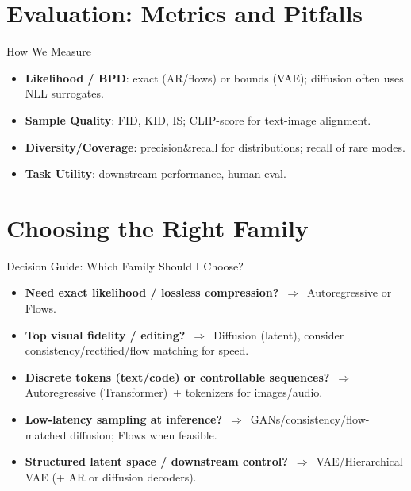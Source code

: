 \documentclass[aspectratio=169]{beamer}
\begin{document}
\section{Evaluation: Metrics and Pitfalls}

\begin{frame}{How We Measure}
\begin{itemize}
  \item \textbf{Likelihood / BPD}: exact (AR/flows) or bounds (VAE); diffusion often uses NLL surrogates.
  \item \textbf{Sample Quality}: FID, KID, IS; CLIP-score for text-image alignment.
  \item \textbf{Diversity/Coverage}: precision\&recall for distributions; recall of rare modes.
  \item \textbf{Task Utility}: downstream performance, human eval.
\end{itemize}
\end{frame}

\section{Choosing the Right Family}

\begin{frame}{Decision Guide: Which Family Should I Choose?}
\small
\begin{itemize}
  \item \textbf{Need exact likelihood / lossless compression?} $\,\Rightarrow\,$ Autoregressive or Flows.
  \item \textbf{Top visual fidelity / editing?} $\,\Rightarrow\,$ Diffusion (latent), consider consistency/rectified/flow matching for speed.
  \item \textbf{Discrete tokens (text/code) or controllable sequences?} $\,\Rightarrow\,$ Autoregressive (Transformer) \,+ tokenizers for images/audio.
  \item \textbf{Low-latency sampling at inference?} $\,\Rightarrow\,$ GANs/consistency/flow-matched diffusion; Flows when feasible.
  \item \textbf{Structured latent space / downstream control?} $\,\Rightarrow\,$ VAE/Hierarchical VAE (+ AR or diffusion decoders).
\end{itemize}
\end{frame}
\end{document}
